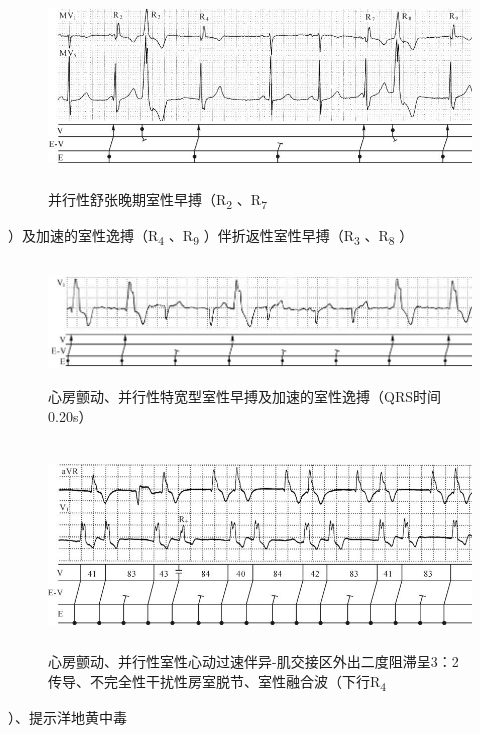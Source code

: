 \begin{figure}[!htbp]
 \centering
 \includegraphics[width=5.69792in,height=2.07292in]{./images/Image00286.jpg}
 \captionsetup{justification=centering}
 \caption{并行性舒张晚期室性早搏（R\textsubscript{2} 、R\textsubscript{7}}
 \label{fig16-10}
  \end{figure} 
）及加速的室性逸搏（R\textsubscript{4} 、R\textsubscript{9}
）伴折返性室性早搏（R\textsubscript{3} 、R\textsubscript{8} ）

\begin{figure}[!htbp]
 \centering
 \includegraphics[width=5.83333in,height=1.26042in]{./images/Image00287.jpg}
 \captionsetup{justification=centering}
 \caption{心房颤动、并行性特宽型室性早搏及加速的室性逸搏（QRS时间0.20s）}
 \label{fig16-11}
  \end{figure} 

\begin{figure}[!htbp]
 \centering
 \includegraphics[width=5.69792in,height=2.15625in]{./images/Image00288.jpg}
 \captionsetup{justification=centering}
 \caption{心房颤动、并行性室性心动过速伴异-肌交接区外出二度阻滞呈3：2传导、不完全性干扰性房室脱节、室性融合波（下行R\textsubscript{4}}
 \label{fig16-12}
  \end{figure} 
）、提示洋地黄中毒

